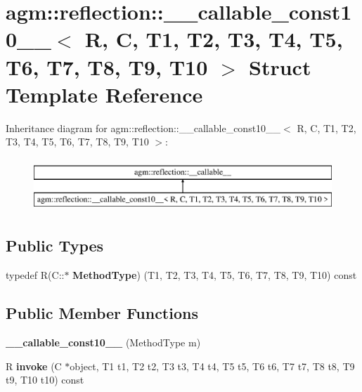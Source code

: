 \hypertarget{structagm_1_1reflection_1_1____callable__const10____}{}\section{agm\+:\+:reflection\+:\+:\+\_\+\+\_\+callable\+\_\+const10\+\_\+\+\_\+$<$ R, C, T1, T2, T3, T4, T5, T6, T7, T8, T9, T10 $>$ Struct Template Reference}
\label{structagm_1_1reflection_1_1____callable__const10____}
Inheritance diagram for agm\+:\+:reflection\+:\+:\+\_\+\+\_\+callable\+\_\+const10\+\_\+\+\_\+$<$ R, C, T1, T2, T3, T4, T5, T6, T7, T8, T9, T10 $>$\+:\begin{figure}[H]
\begin{center}
\leavevmode
\includegraphics[height=2.000000cm]{structagm_1_1reflection_1_1____callable__const10____}
\end{center}
\end{figure}
\subsection*{Public Types}
\begin{DoxyCompactItemize}
\item 
typedef R(C\+::$\ast$ {\bfseries Method\+Type}) (T1, T2, T3, T4, T5, T6, T7, T8, T9, T10) const \hypertarget{structagm_1_1reflection_1_1____callable__const10_____af5c85c588232801b221f7f7aa20377b0}{}\label{structagm_1_1reflection_1_1____callable__const10_____af5c85c588232801b221f7f7aa20377b0}

\end{DoxyCompactItemize}
\subsection*{Public Member Functions}
\begin{DoxyCompactItemize}
\item 
{\bfseries \+\_\+\+\_\+callable\+\_\+const10\+\_\+\+\_\+} (Method\+Type m)\hypertarget{structagm_1_1reflection_1_1____callable__const10_____ac83c76772163deac5f1d34cfd946a0d8}{}\label{structagm_1_1reflection_1_1____callable__const10_____ac83c76772163deac5f1d34cfd946a0d8}

\item 
R {\bfseries invoke} (C $\ast$object, T1 t1, T2 t2, T3 t3, T4 t4, T5 t5, T6 t6, T7 t7, T8 t8, T9 t9, T10 t10) const \hypertarget{structagm_1_1reflection_1_1____callable__const10_____a96c47e641a088d8967f5787aae87181f}{}\label{structagm_1_1reflection_1_1____callable__const10_____a96c47e641a088d8967f5787aae87181f}

\end{DoxyCompactItemize}
